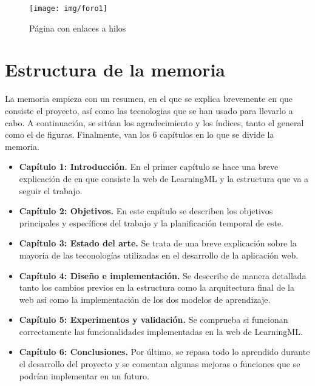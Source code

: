 \documentclass[a4paper, 12pt]{book}
\begin{document}
 \begin{figure}
    \centering
    \texttt{[image: img/foro1]}
    \caption{Página con enlaces a hilos}
    \label{figura:foro_hilos}
 \end{figure}

\section{Estructura de la memoria}
\label{sec:estructura}

La memoria empieza con un resumen, en el que se explica brevemente en que consiste el proyecto, así como las tecnologias que se han usado para llevarlo a cabo. A continuación, se sitúan los agradecimiento y los índices, tanto el general como el de figuras. Finalmente, van los 6 capítulos en lo que se divide la memoria.

\begin{itemize}
  \item \textbf{Capítulo 1: Introducción.} En el primer capítulo se hace una breve explicación de en que consiste la web de LearningML y la estructura que va a seguir el trabajo.
  
  \item \textbf{Capítulo 2: Objetivos.} En este capítulo se describen los objetivos principales y específicos del trabajo y la planificación temporal de este.
  
  \item \textbf{Capítulo 3: Estado del arte.} Se trata de una breve explicación sobre la mayoría de las teconologías utilizadas en el desarrollo de la aplicación web.

  \item \textbf{Capítulo 4: Diseño e implementación.} Se desccribe de manera detallada tanto los cambios previos en la estructura como la arquitectura final de la web así como la implementación de los dos modelos de aprendizaje.
  
  \item \textbf{Capítulo 5: Experimentos y validación.} Se comprueba si funcionan correctamente las funcionalidades implementadas en la web de LearningML.
  
  \item \textbf{Capítulo 6: Conclusiones.} Por último, se repasa todo lo aprendido durante el desarrollo del proyecto y se comentan algunas mejoras o funciones que se podrían implementar en un futuro.
  
\end{itemize}
\end{document}
